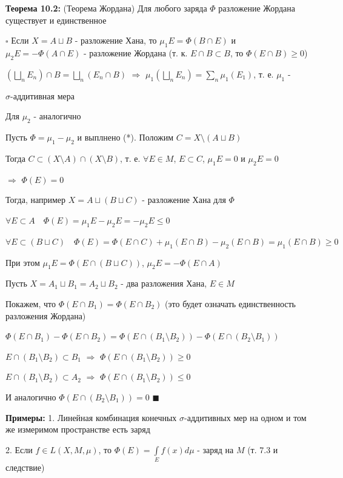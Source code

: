 \documentclass[a4paper]{report}
\begin{document}
\noindent\textbf{Теорема 10.2:} (Теорема Жордана) Для любого заряда $\Phi$ разложение Жордана существует и единственное

\noindent $\square$ Если $X=A\sqcup B$ - разложение Хана, то $\mu_1 E=\Phi(B\cap E)$ и $\mu_2E=-\Phi(A\cap E)$ - разложение Жордана (т. к. $E\cap B\subset B$, то $\Phi(E\cap B)\ge0$)

$\left(\bigsqcup\limits_n E_n\right)\cap B=\bigsqcup\limits_n(E_n\cap B)$ $\Rightarrow$ $\mu_1\left(\bigsqcup\limits_n E_n\right)=\sum\limits_n\mu_1(E_1)$, т. е. 
$\mu_1$ - 

\noindent$\sigma$-аддитивная мера

Для $\mu_2$ - аналогично

Пусть $\Phi=\mu_1-\mu_2$ и выплнено (*). Положим $C=X\setminus(A\sqcup B)$

Тогда $C\subset(X\setminus A)\cap(X\setminus B)$, т. е. $\forall E\in M$, $E\subset C$, $\mu_1 E=0$ и $\mu_2 E=0$ 

\noindent$\Rightarrow$ $\Phi(E)=0$

Тогда, например $X=A\sqcup(B\sqcup C)$ - разложение Хана для $\Phi$

$\forall E\subset A\quad\Phi(E)=\mu_1E-\mu_2E=-\mu_2E\le0$

$\forall E\subset(B\sqcup C)\quad\Phi(E)=\Phi(E\cap C)+\mu_1(E\cap B)-\mu_2(E\cap B)=\mu_1(E\cap B)\ge0$

При этом $\mu_1 E=\Phi\left(E\cap(B\sqcup C)\right)$, $\mu_2E=-\Phi(E\cap A)$

Пусть $X=A_1\sqcup B_1=A_2\sqcup B_2$ - два разложения Хана, $E\in M$

Покажем, что $\Phi(E\cap B_1)=\Phi(E\cap B_2)$ (это будет означать единственность разложения Жордана)

$\Phi(E\cap B_1)-\Phi(E\cap B_2)=\Phi(E\cap(B_1\setminus B_2))-\Phi(E\cap(B_2\setminus B_1))$

$E\cap(B_1\setminus B_2)\subset B_1$ $\Rightarrow$ $\Phi(E\cap(B_1\setminus B_2))\ge0$

$E\cap(B_1\setminus B_2)\subset A_2$ $\Rightarrow$ $\Phi(E\cap(B_1\setminus B_2))\le0$

И аналогично $\Phi(E\cap(B_2\setminus B_1))=0$ $\blacksquare$
\bigskip

\noindent\textbf{Примеры:} 1. Линейная комбинация конечных $\sigma$-аддитивных мер на одном и том же измеримом пространстве есть заряд

2. Если $f\in L(X,M,\mu)$, то $\Phi(E)=\displaystyle\int\limits_E f(x)d\mu$ - заряд на $M$ (т. 7.3 и следствие)
\bigskip
\end{document}

